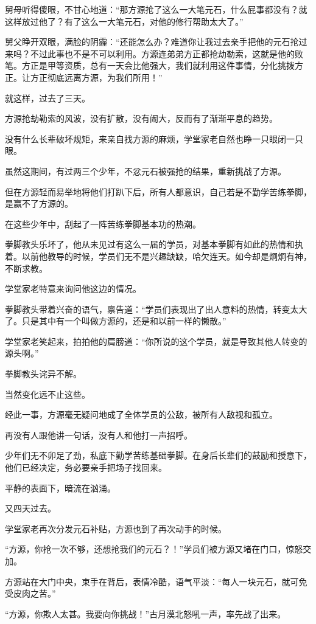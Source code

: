 \begin{this_body}
舅母听得傻眼，不甘心地道：“那方源抢了这么一大笔元石，什么屁事都没有？就这样放过他了？有了这么一大笔元石，对他的修行帮助太大了。”

舅父睁开双眼，满脸的阴霾：“还能怎么办？难道你让我过去亲手把他的元石抢过来吗？不过此事也不是不可以利用。方源连弟弟方正都抢劫勒索，这就是他的败笔。方正是甲等资质，总有一天会比他强大，我们就利用这件事情，分化挑拨方正。让方正彻底远离方源，为我们所用！”

就这样，过去了三天。

方源抢劫勒索的风波，没有扩散，没有闹大，反而有了渐渐平息的趋势。

没有什么长辈破坏规矩，来亲自找方源的麻烦，学堂家老自然也睁一只眼闭一只眼。

虽然这期间，有过两三个少年，不忿元石被强抢的结果，重新挑战了方源。

但在方源轻而易举地将他们打趴下后，所有人都意识，自己若是不勤学苦练拳脚，是赢不了方源的。

在这些少年中，刮起了一阵苦练拳脚基本功的热潮。

拳脚教头乐坏了，他从未见过有这么一届的学员，对基本拳脚有如此的热情和执着。以前他教导的时候，学员们无不是兴趣缺缺，哈欠连天。如今却是炯炯有神，不断求教。

学堂家老特意来询问他这边的情况。

拳脚教头带着兴奋的语气，禀告道：“学员们表现出了出人意料的热情，转变太大了。只是其中有一个叫做方源的，还是和以前一样的懒散。”

学堂家老笑起来，拍拍他的肩膀道：“你所说的这个学员，就是导致其他人转变的源头啊。”

拳脚教头诧异不解。

当然变化远不止这些。

经此一事，方源毫无疑问地成了全体学员的公敌，被所有人敌视和孤立。

再没有人跟他讲一句话，没有人和他打一声招呼。

少年们无不卯足了劲，私底下勤学苦练基础拳脚。在身后长辈们的鼓励和授意下，他们已经决定，务必要亲手把场子找回来。

平静的表面下，暗流在汹涌。

又四天过去。

学堂家老再次分发元石补贴，方源也到了再次动手的时候。

“方源，你抢一次不够，还想抢我们的元石？！”学员们被方源又堵在门口，惊怒交加。

方源站在大门中央，束手在背后，表情冷酷，语气平淡：“每人一块元石，就可免受皮肉之苦。”

“方源，你欺人太甚。我要向你挑战！”古月漠北怒吼一声，率先战了出来。


\end{this_body}
